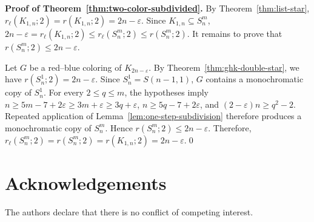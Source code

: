 \documentclass[11pt]{article}
\theoremstyle{definition}
\theoremstyle{remark}
\begin{document}
\textbf{Proof of Theorem~\ref{thm:two-color-subdivided}.} By
Theorem~\ref{thm:list-star},
\(r_{\ell}(K_{1,n};2)=r(K_{1,n};2)=2n-\varepsilon\).
Since \(K_{1,n}\subseteq S_n^m\),
\(2n-\varepsilon =r_{\ell}(K_{1,n};2) \leq r_{\ell}(S_n^m;2) \leq r(S_n^m;2)\).
It remains to prove that \(r(S_n^m;2)\leq2n-\varepsilon\).

Let \(G\) be a red--blue coloring of \(K_{2n-\varepsilon}\). By Theorem~\ref{thm:ghk-double-star}, we have \(r(S_n^1;2)=2n-\varepsilon\). Since \(S_n^1=S(n-1,1)\), \(G\) contains a monochromatic copy of \(S_n^1\). For every \(2\le q\le m\), the hypotheses imply
\(n\ge5m-7+2\varepsilon\ge3m+\varepsilon\ge3q+\varepsilon\),
\(n\ge5q-7+2\varepsilon\), and
\((2-\varepsilon)n\ge q^2-2\).
Repeated application of Lemma~\ref{lem:one-step-subdivision}
therefore produces a monochromatic copy of \(S_n^m\). Hence
\(r(S_n^m;2)\leq2n-\varepsilon\).
Therefore,
\(r_{\ell}(S_n^m;2) =r(S_n^m;2) =r(K_{1,n};2) =2n-\varepsilon\).\qed


\section*{Acknowledgements}
\noindent
The authors declare that there is no conflict of competing interest.
\end{document}
